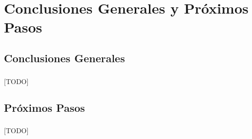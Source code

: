 \documentclass{subfiles}
\begin{document}
  \chapter{Conclusiones Generales y Próximos Pasos}
  \label{chap:conclusions}

    \section{Conclusiones Generales}
    \label{sec:conclusion_general_conclusions}

      \paragraph{}
      [TODO]

    \section{Próximos Pasos}
    \label{sec:conclusion_next_steps}

      \paragraph{}
      [TODO]
\end{document}
